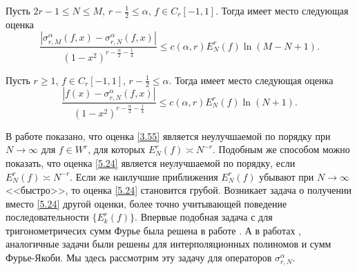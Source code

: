 \begin{lemma} Пусть $2r-1\le N\le M$, $r-\frac12\le\alpha$, $f\in C_r[-1,1]$. Тогда имеет место следующая оценка
\begin{equation}\label{5.22}
\frac{|\sigma_{r,M}^\alpha(f,x)-\sigma_{r,N}^\alpha(f,x)|}
{(1-x^2)^{r-\frac{\alpha}{2}-\frac14}}\le
c(\alpha,r)E_N^r(f)\ln(M-N+1).
 \end{equation}
\end{lemma}


\begin{lemma} Пусть $r\ge1$, $f\in C_r[-1,1]$, $r-\frac12\le\alpha$. Тогда имеет место следующая оценка
\begin{equation}\label{5.24}
\frac{|f(x)-\sigma_{r,N}^\alpha(f,x)|}
{(1-x^2)^{r-\frac{\alpha}{2}-\frac14}}\le
c(\alpha,r)E_N^r(f)\ln(N+1).
 \end{equation}
\end{lemma}

В работе \cite{Shar15} показано, что оценка \eqref{3.55}  является неулучшаемой по порядку при $N\to\infty$ для  $f\in W^r$, для которых $E^{r}_{N}(f)\asymp N^{-r}$. Подобным же способом можно показать, что оценка  \eqref{5.24} является неулучшаемой по порядку, если $E^{r}_{N}(f)\asymp N^{-r}$.   Если же  наилучшие приближения  $E^{r}_{N}(f)$ убывают при $N\to\infty$ <<быстро>>, то оценка \eqref{5.24}   становится грубой. Возникает задача о получении вместо \eqref{5.24} другой оценки, более точно учитывающей поведение последовательности  $\{E^{r}_{k}(f)\}$. Впервые подобная задача с для тригонометричесих сумм Фурье была решена в работе \cite{OSK}. А в работах \cite{sharap1}, \cite{sharap2} аналогичные задачи были решены для интерполяционных полиномов и сумм Фурье-Якоби. Мы здесь рассмотрим  эту задачу  для операторов $\sigma_{r,N}^\alpha$.

